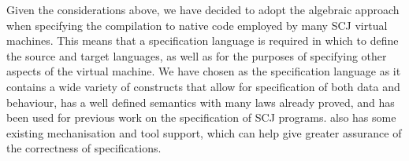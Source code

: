 Given the considerations above, we have decided to adopt the algebraic
approach when specifying the compilation to native code employed by
many SCJ virtual machines.
This means that a specification language is required in which to
define the source and target languages, as well as for the purposes of
specifying other aspects of the virtual machine.
We have chosen \Circus{} as the specification language as it contains
a wide variety of constructs that allow for specification of both data
and behaviour, has a well defined semantics with many laws already
proved, and has been used for previous work on the specification of
SCJ programs.
\Circus{} also has some existing mechanisation and tool support, which
can help give greater assurance of the correctness of specifications.

 

